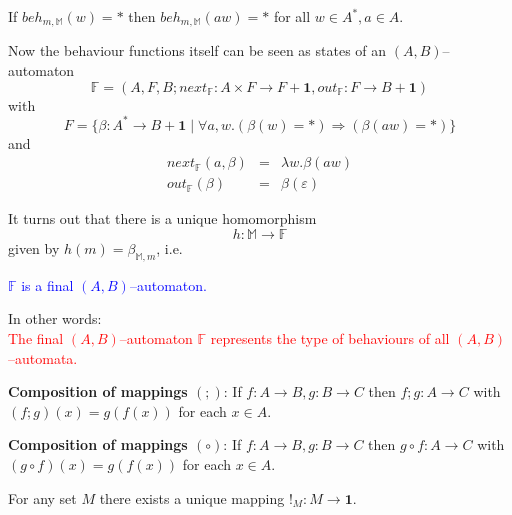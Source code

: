 \documentclass[landscape, autoslides, light]{mmiss}
\begin{document}
\begin{Package}[Label={FSDPT}, Title={Formal Specification of Data and Process Types}, ShortTitle={FSDPT}, Authors={Horst Reichel}, Date={February 2003}, LevelOfDetail=Lecture, Language=en-GB]
\begin{Section}[Title={Introduction}, Label={section2}]
\begin{Paragraph}[Title={Basic Intuition - Finality}, Label=Paragraph17]
If $beh_{m,\mathbb{M}}(w) = *$ then $beh_{m,\mathbb{M}}(aw) = *$
for all $w \in A^*, a \in A$.

Now the behaviour functions itself can be seen as states of an
$(A, B)$--automaton
$$\mathbb{F} = (A, F, B; next_{\mathbb F}: A
\times F \to F + \mathbf{1}, out_{\mathbb F}: F \to B +
\mathbf{1})$$ with $$ F = \{ \beta: A^* \to B + \mathbf{1}\; | \;
\forall a,w .(\beta(w) = \ast) \Rightarrow (\beta(aw) = \ast)\}$$
and $$\begin{array}{lll} next_{\mathbb F}(a, \beta) & = & \lambda
w . \beta(aw)\\ out_{\mathbb F} (\beta) & = & \beta(\varepsilon)
\end{array}$$

It turns out that there is a unique homomorphism
$$h : \mathbb{M} \to \mathbb{F}$$  given
 by $h(m) = \beta_{\mathbb{M}, m}$, i.e.\begin{center}
 \textcolor{blue}{$\mathbb{F}$ is a final $(A, B)$--automaton.}
\end{center}
\pause In other words: \\ \pause \textcolor{red}{The final
$(A,B)$--automaton $\mathbb F$ represents the type of behaviours
of all $(A,B)$--automata.}

\end{Paragraph}
\begin{Paragraph}[Title={Notation}, Label=Paragraph19]

\small
\begin{List}[ListType=itemize]
\ListItem \textbf{Composition of mappings $(;)$}: If $f: A \to B, g :
B \to C$ then $f;g : A \to C$ with $(f;g)(x) = g(f(x))$ for each
$x \in A$.\pause

\ListItem \textbf{Composition of mappings $(\circ)$}: If $f: A \to B,
g : B \to C$ then $g \circ f : A \to C$ with $(g \circ f)(x) =
g(f(x))$ for each $x \in A$.\pause

\ListItem For any set $M$ there exists a unique mapping $!_M : M \to
\mathbf{1}$. \pause


\end{List}
\end{Paragraph}
\end{Section}
\end{Package}
\end{document}
